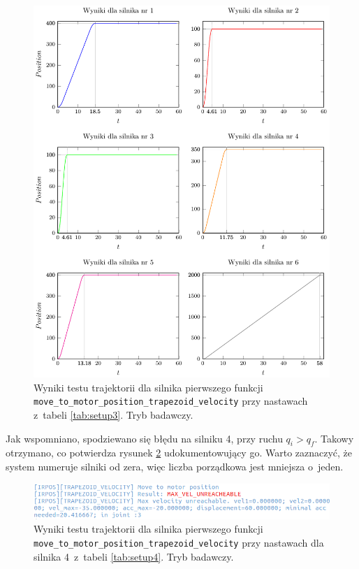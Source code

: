 \documentclass[a4paper, 12pt]{article}
\begin{document}
	\begin{figure}[H]
		\centering
		\includegraphics[scale=1.1]{raport_graphs/simpMPVRall.pdf}
		\caption{Wyniki testu trajektorii dla silnika pierwszego funkcji \texttt{move\_to\_motor\_position\_trapezoid\_velocity} przy nastawach z~tabeli \ref{tab:setup3}. Tryb badawczy.}
		\label{fig:simpMPVRall}
	\end{figure}
	
	Jak wspomniano, spodziewano się błędu na silniku 4, przy ruchu $ q_i>q_f$. Takowy otrzymano, co potwierdza rysunek \ref{fig:res_fail_msg} udokumentowujący go. Warto zaznaczyć, że system numeruje silniki od zera, więc liczba porządkowa jest mniejsza o~jeden.
	
	\begin{figure}[H]
	 	\centering
	 	\includegraphics[scale=0.635]{raport_pics/res_fail_msg.png}
	 	\caption{Wyniki testu trajektorii dla silnika pierwszego funkcji \texttt{move\_to\_motor\_position\_trapezoid\_velocity} przy nastawach dla silnika 4~z~tabeli \ref{tab:setup4}. Tryb badawczy.}
		\label{fig:res_fail_msg}
	\end{figure}
	
\end{document}
